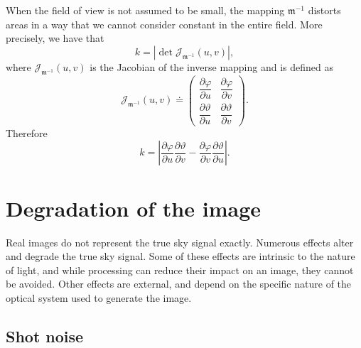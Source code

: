 \begin{tcolorbox}[colback=blue!5!white, colframe=blue!50!black, title=Technical note]
    When the field of view is not assumed to be small, the mapping $\boldsymbol{\mathfrak{m}}^{-1}$ distorts areas in a way that we cannot consider constant in the entire field. More precisely, we have that
    \[
        k=\left|\det{\mathcal{J}}_{\boldsymbol{\mathfrak{m}}^{-1}}(u,v)\right|,
    \]
    where $\mathcal{J}_{\boldsymbol{\mathfrak{m}}^{-1}}(u,v)$ is the Jacobian of the inverse mapping and is defined as
    \[
        \mathcal{J}_{\boldsymbol{\mathfrak{m}}^{-1}}(u,v)\doteq\begin{pmatrix}
            \dfrac{\partial\varphi}{\partial u}&\dfrac{\partial\varphi}{\partial v}\\[4mm]\dfrac{\partial\vartheta}{\partial u}&\dfrac{\partial\vartheta}{\partial v}
        \end{pmatrix}.
    \]
    Therefore
    \[
        k=\left|\dfrac{\partial\varphi}{\partial u}\dfrac{\partial\vartheta}{\partial v}-\dfrac{\partial\varphi}{\partial v}\dfrac{\partial\vartheta}{\partial u}\right|.
    \]
\end{tcolorbox}\vspace{2mm}\noindent

\section{Degradation of the image}

Real images do not represent the true sky signal exactly.
Numerous effects alter and degrade the true sky signal.
Some of these effects are intrinsic to the nature of light, and while processing can reduce their impact on an image, they cannot be avoided.
Other effects are external, and depend on the specific nature of the optical system used to generate the image.

\subsection{Shot noise}

